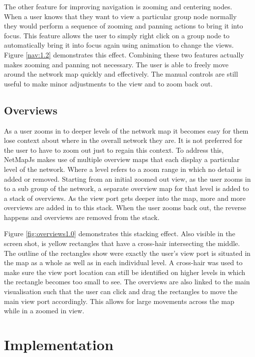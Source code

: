 \documentclass[11pt, a4paper]{article}
\begin{document}
The other feature for improving navigation is zooming and centering nodes. When
a user knows that they want to view a particular group node normally they would
perform a sequence of zooming and panning actions to bring it into focus. This
feature allows the user to simply right click on a group node to automatically
bring it into focus again using animation to change the views. Figure
\ref{nav:1.2} demonstrates this effect. Combining these two features actually
makes zooming and panning not necessary. The user is able to freely move around
the network map quickly and effectively. The manual controls are still useful to
make minor adjustments to the view and to zoom back out.


\subsection{Overviews}
\label{sec:overviews}

As a user zooms in to deeper levels of the network map it becomes easy for them
lose context about where in the overall network they are. It is not preferred
for the user to have to zoom out just to regain this context. To address this,
NetMapJs makes use of multiple overview maps that each display a particular
level of the network. Where a level refers to a zoom range in which no detail is
added or removed. Starting from an initial zoomed out view, as the user zooms
in to a sub group of the network, a separate overview map for that level is
added to a stack of overviews. As the view port gets deeper into the map, more
and more overviews are added in to this stack. When the user zooms back out, the
reverse happens and overviews are removed from the stack.

Figure \ref{fig:overviews1.0} demonstrates this stacking effect. Also visible in
the screen shot, is yellow rectangles that have a cross-hair intersecting the
middle. The outline of the rectangles show were exactly the user's view port is
situated in the map as a whole as well as in each individual level. A cross-hair
was used to make sure the view port location can still be identified on higher
levels in which the rectangle becomes too small to see. The overviews are also
linked to the main visualisation such that the user can click and drag the
rectangles to move the main view port accordingly. This allows for large
movements across the map while in a zoomed in view.


\section{Implementation} 
\label{sec:implementation}
\end{document}
